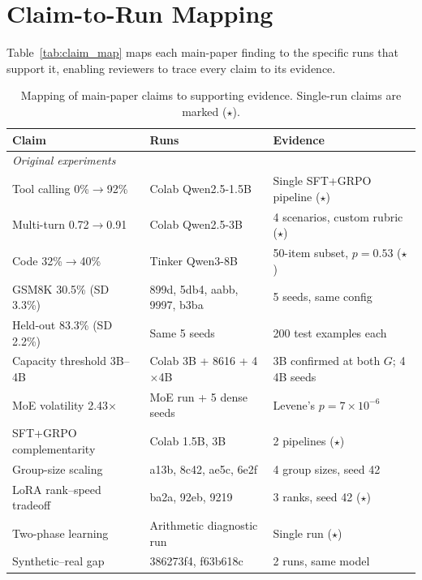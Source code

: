 \documentclass{article}
\begin{document}
\section{Claim-to-Run Mapping}

Table~\ref{tab:claim_map} maps each main-paper finding to the specific runs that support it, enabling reviewers to trace every claim to its evidence.

\begin{table}[htbp]
    \centering
    \footnotesize
    \caption{Mapping of main-paper claims to supporting evidence. Single-run claims are marked ($\star$).}
    \begin{tabular}{p{3.8cm}lp{4.5cm}}
        \toprule
        Claim & Runs & Evidence \\
        \midrule
        \multicolumn{3}{l}{\emph{Original experiments}} \\
        Tool calling 0\%$\rightarrow$92\% & Colab Qwen2.5-1.5B & Single SFT+GRPO pipeline ($\star$) \\
        Multi-turn 0.72$\rightarrow$0.91 & Colab Qwen2.5-3B & 4 scenarios, custom rubric ($\star$) \\
        Code 32\%$\rightarrow$40\% & Tinker Qwen3-8B & 50-item subset, $p{=}0.53$ ($\star$) \\
        GSM8K 30.5\% (SD 3.3\%) & 899d, 5db4, aabb, 9997, b3ba & 5 seeds, same config \\
        Held-out 83.3\% (SD 2.2\%) & Same 5 seeds & 200 test examples each \\
        Capacity threshold 3B--4B & Colab 3B + 8616 + 4$\times$4B & 3B confirmed at both $G$; 4 4B seeds \\
        MoE volatility 2.43$\times$ & MoE run + 5 dense seeds & Levene's $p{=}7{\times}10^{-6}$ \\
        SFT+GRPO complementarity & Colab 1.5B, 3B & 2 pipelines ($\star$) \\
        Group-size scaling & a13b, 8c42, ae5c, 6e2f & 4 group sizes, seed 42 \\
        LoRA rank--speed tradeoff & ba2a, 92eb, 9219 & 3 ranks, seed 42 ($\star$) \\
        Two-phase learning & Arithmetic diagnostic run & Single run ($\star$) \\
        Synthetic--real gap & 386273f4, f63b618c & 2 runs, same model \\

\end{tabular}
\end{table}
\end{document}
